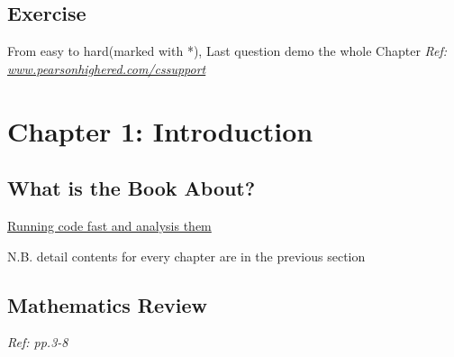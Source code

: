 \documentclass[12pt]{article}
\begin{document}
\subsection{Exercise}
From easy to hard(marked with *), Last question demo the whole Chapter
\textit{Ref: \url{www.pearsonhighered.com/cssupport}}

\section{Chapter 1: Introduction}
\subsection{What is the Book About?}
\underline{Running code fast and analysis them}

N.B. detail contents for every chapter are in the previous section

\subsection{Mathematics Review}
\emph{Ref: pp.3-8}
\end{document}
